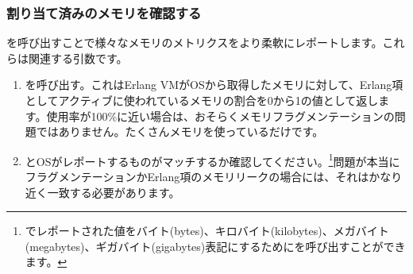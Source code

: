 \subsubsection{割り当て済みのメモリを確認する}

を呼び出すことで様々なメモリのメトリクスをより柔軟にレポートします。これらは関連する引数です。

\begin{enumerate}
	\item {}を呼び出す。これはErlang VMがOSから取得したメモリに対して、Erlang項としてアクティブに使われているメモリの割合を0から1の値として返します。使用率が100\%に近い場合は、おそらくメモリフラグメンテーションの問題ではありません。たくさんメモリを使っているだけです。
  \item {}とOSがレポートするものがマッチするか確認してください。\footnote{でレポートされた値をバイト(bytes)、キロバイト(kilobytes)、メガバイト(megabytes)、ギガバイト(gigabytes)表記にするためにを呼び出すことができます。}問題が本当にフラグメンテーションかErlang項のメモリリークの場合には、それはかなり近く一致する必要があります。
\end{enumerate}

